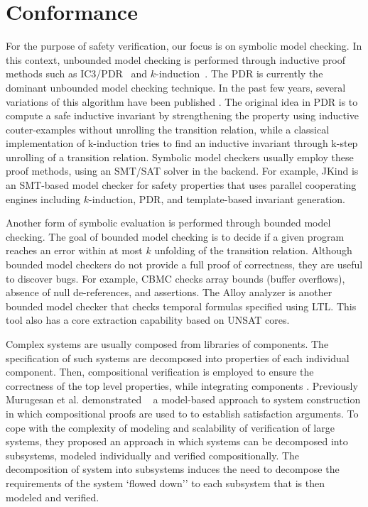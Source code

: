 \section{Conformance}
For the purpose of safety verification, our focus is on symbolic model checking. In this context, unbounded model checking is performed through inductive proof methods such as IC3/PDR~\cite{Een2011:PDR} and $k$-induction~\cite{SheeranSS00}.
The PDR is currently the dominant unbounded model checking technique. In the past few years, several variations of this algorithm have been published \cite{hoder2012generalized, vizel2014interpolating, jovanovic2016property, gurfinkelk}.
The original idea in PDR is to compute  a
safe  inductive  invariant by strengthening the property using inductive couter-examples without unrolling the transition relation, while a classical implementation of
k-induction tries to find an inductive invariant through
k-step unrolling of a transition relation. Symbolic model checkers usually employ these proof methods, using an SMT/SAT solver in the backend. For example, JKind \cite{jkind} is an SMT-based model checker for safety properties that uses parallel cooperating engines including $k$-induction, PDR, and template-based invariant generation.

Another form of symbolic evaluation is performed through bounded model checking.
The goal of bounded model checking is to decide if a given program reaches an error within at
most $k$ unfolding of the transition relation. Although bounded model checkers do not provide a full proof of correctness, they are useful to discover bugs. For example, CBMC \cite{cbmc} checks array bounds (buffer overflows), absence of
null de-references, and assertions. The Alloy analyzer \cite{alloy} is another bounded model checker that checks temporal formulas specified using LTL. This tool also has a core extraction capability based on UNSAT cores.

Complex systems are usually composed from libraries of components. The specification of such systems are decomposed into properties of each individual component. Then, compositional verification is employed to ensure the correctness of the top level properties, while integrating components \cite{NFM2012:CoGaMiWhLaLu}. Previously Murugesan et al. demonstrated ~\cite{hilt2013} a model-based approach to system construction in which compositional proofs are used to to establish satisfaction arguments. To cope with the complexity of modeling and scalability of verification of large systems,
they proposed an approach in which systems can be decomposed into subsystems, modeled individually and verified compositionally. The decomposition of system into subsystems induces the need to decompose the requirements of the system `flowed down'' to each subsystem that is then modeled and verified.

